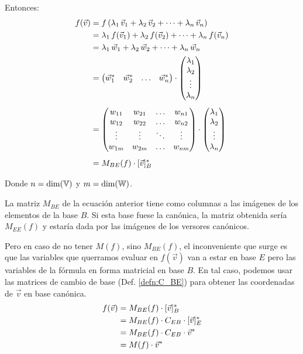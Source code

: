 \documentclass[a5paper,12pt,twoside]{book}
\begin{document}
Entonces:
\begin{align*}
    f(\Vec{v}) &= f \left( \lambda_1 \, \Vec{v}_1 + \lambda_2 \, \Vec{v}_2 + \dots + \lambda_n \, \Vec{v}_n \right)
    \\
    &= \lambda_1 \, f(\Vec{v}_1) + \lambda_2 \, f(\Vec{v}_2) + \dots + \lambda_n \, f(\Vec{v}_n)
    \\
    &= \lambda_1 \, \Vec{w}_1 + \lambda_2 \, \Vec{w}_2 + \dots + \lambda_n \, \Vec{w}_n
    \\
    &=
    \begin{pmatrix}
        \Vec{w}_1^* & \Vec{w}_2^* & \dots & \Vec{w}_n^*
    \end{pmatrix}
    \cdot
    \begin{pmatrix}
        \lambda_1
        \\
        \lambda_2
        \\
        \vdots
        \\
        \lambda_n
    \end{pmatrix}
    \\[1ex]
    &=
    \begin{pmatrix}
        w_{11} & w_{21} & \dots & w_{n 1}
        \\
        w_{12} & w_{22} & \dots & w_{n 2}
        \\
        \vdots & \vdots & \ddots & \vdots
        \\
        w_{1 m} & w_{2 m} & \dots & w_{n m}
    \end{pmatrix}
    \cdot
    \begin{pmatrix}
        \lambda_1
        \\
        \lambda_2
        \\
        \vdots
        \\
        \lambda_n
    \end{pmatrix}
    \\[1ex]
    &= M_{BE} (f) \cdot [\Vec{v}]_B^*
\end{align*}

Donde $n=\operatorname{dim}(\mathbb{V})$ y $m=\operatorname{dim}(\mathbb{W})$.

La matriz $M_{BE}$ de la ecuación anterior tiene como columnas a las imágenes de los elementos de la base $B$. Si esta base fuese la canónica, la matriz obtenida sería $M_{EE}(f)$ y estaría dada por las imágenes de los versores canónicos.

Pero en caso de no tener $M(f)$, sino $M_{BE}(f)$, el inconveniente que surge es que las variables que querramos evaluar en $f(\Vec{v})$ van a estar en base $E$ pero las variables de la fórmula en forma matricial en base $B$. En tal caso, podemos usar las matrices de cambio de base (Def. \ref{defn:C_BE}) para obtener las coordenadas de $\Vec{v}$ en base canónica.
\begin{align*}
    f(\Vec{v}) &= M_{BE} (f) \cdot [\Vec{v}]_B^*
    \\
    &= M_{BE} (f) \cdot C_{EB} \cdot [\Vec{v}]_E^*
    \\
    &= M_{BE} (f) \cdot C_{EB} \cdot \Vec{v}^*
    \\
    &= M(f) \cdot \Vec{v}^*
\end{align*}
\end{document}
